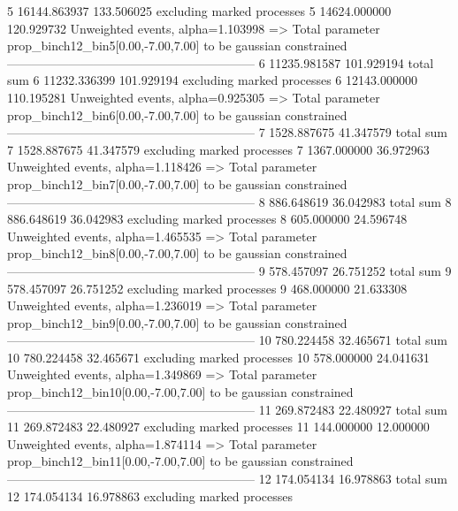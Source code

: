 5          16144.863937    133.506025      excluding marked processes    
5          14624.000000    120.929732      Unweighted events, alpha=1.103998
  => Total parameter prop_binch12_bin5[0.00,-7.00,7.00] to be gaussian constrained
------------------------------------------------------------
6          11235.981587    101.929194      total sum                     
6          11232.336399    101.929194      excluding marked processes    
6          12143.000000    110.195281      Unweighted events, alpha=0.925305
  => Total parameter prop_binch12_bin6[0.00,-7.00,7.00] to be gaussian constrained
------------------------------------------------------------
7          1528.887675     41.347579       total sum                     
7          1528.887675     41.347579       excluding marked processes    
7          1367.000000     36.972963       Unweighted events, alpha=1.118426
  => Total parameter prop_binch12_bin7[0.00,-7.00,7.00] to be gaussian constrained
------------------------------------------------------------
8          886.648619      36.042983       total sum                     
8          886.648619      36.042983       excluding marked processes    
8          605.000000      24.596748       Unweighted events, alpha=1.465535
  => Total parameter prop_binch12_bin8[0.00,-7.00,7.00] to be gaussian constrained
------------------------------------------------------------
9          578.457097      26.751252       total sum                     
9          578.457097      26.751252       excluding marked processes    
9          468.000000      21.633308       Unweighted events, alpha=1.236019
  => Total parameter prop_binch12_bin9[0.00,-7.00,7.00] to be gaussian constrained
------------------------------------------------------------
10         780.224458      32.465671       total sum                     
10         780.224458      32.465671       excluding marked processes    
10         578.000000      24.041631       Unweighted events, alpha=1.349869
  => Total parameter prop_binch12_bin10[0.00,-7.00,7.00] to be gaussian constrained
------------------------------------------------------------
11         269.872483      22.480927       total sum                     
11         269.872483      22.480927       excluding marked processes    
11         144.000000      12.000000       Unweighted events, alpha=1.874114
  => Total parameter prop_binch12_bin11[0.00,-7.00,7.00] to be gaussian constrained
------------------------------------------------------------
12         174.054134      16.978863       total sum                     
12         174.054134      16.978863       excluding marked processes    
